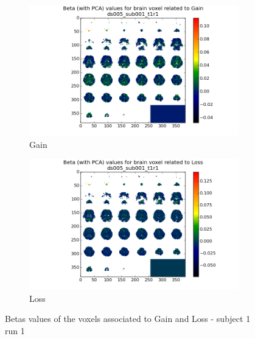 \begin{figure}[H]
\begin{subfigure}{.5\textwidth}
  \centering
  \includegraphics[width=.9\linewidth]{../fig/mosaic/ds005_sub001_t1r1_withPCA_Gain.png}
  \caption{Gain}
  \label{fig:sfig1}
\end{subfigure}%
\begin{subfigure}{.5\textwidth}
  \centering
  \includegraphics[width=.9\linewidth]{../fig/mosaic/ds005_sub001_t1r1_withPCA_Loss.png}
  \caption{Loss}
  \label{fig:sfig2}
\end{subfigure}
\caption{Betas values of the voxels associated to Gain and Loss - subject 1 run 1}
\label{fig:fig}
\end{figure}

